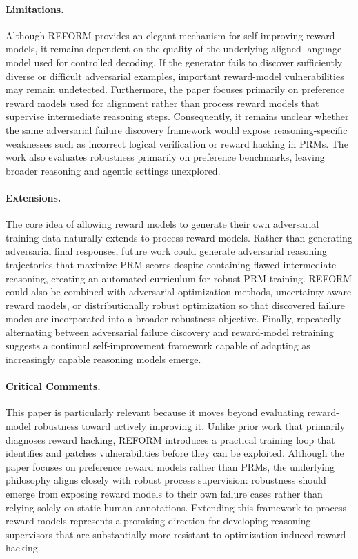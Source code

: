 \documentclass[11pt]{article}
\begin{document}
\paragraph{Limitations.}
Although REFORM provides an elegant mechanism for self-improving reward models, it remains dependent on the quality of the underlying aligned language model used for controlled decoding. If the generator fails to discover sufficiently diverse or difficult adversarial examples, important reward-model vulnerabilities may remain undetected. Furthermore, the paper focuses primarily on preference reward models used for alignment rather than process reward models that supervise intermediate reasoning steps. Consequently, it remains unclear whether the same adversarial failure discovery framework would expose reasoning-specific weaknesses such as incorrect logical verification or reward hacking in PRMs. The work also evaluates robustness primarily on preference benchmarks, leaving broader reasoning and agentic settings unexplored.

\paragraph{Extensions.}
The core idea of allowing reward models to generate their own adversarial training data naturally extends to process reward models. Rather than generating adversarial final responses, future work could generate adversarial reasoning trajectories that maximize PRM scores despite containing flawed intermediate reasoning, creating an automated curriculum for robust PRM training. REFORM could also be combined with adversarial optimization methods, uncertainty-aware reward models, or distributionally robust optimization so that discovered failure modes are incorporated into a broader robustness objective. Finally, repeatedly alternating between adversarial failure discovery and reward-model retraining suggests a continual self-improvement framework capable of adapting as increasingly capable reasoning models emerge.

\paragraph{Critical Comments.}
This paper is particularly relevant because it moves beyond evaluating reward-model robustness toward actively improving it. Unlike prior work that primarily diagnoses reward hacking, REFORM introduces a practical training loop that identifies and patches vulnerabilities before they can be exploited. Although the paper focuses on preference reward models rather than PRMs, the underlying philosophy aligns closely with robust process supervision: robustness should emerge from exposing reward models to their own failure cases rather than relying solely on static human annotations. Extending this framework to process reward models represents a promising direction for developing reasoning supervisors that are substantially more resistant to optimization-induced reward hacking.
\end{document}
